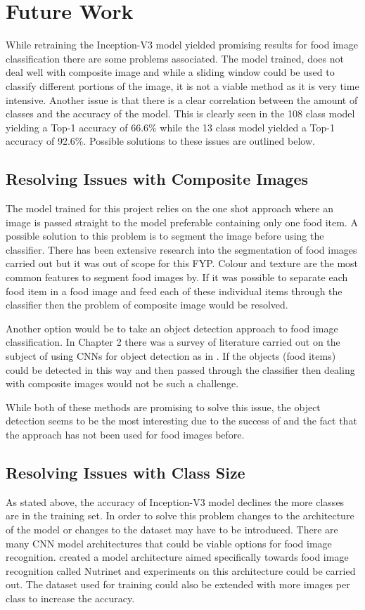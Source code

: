 

\section{Future Work}
While retraining the Inception-V3 model yielded promising results for food image classification there are some problems associated.
The model trained, does not deal well with composite image and while a sliding window could be used to classify different portions of the image, it is not a viable method as it is very time intensive.
Another issue is that there is a clear correlation between the amount of classes and the accuracy of the model.
This is clearly seen in the 108 class model yielding a Top-1 accuracy of 66.6\% while the 13 class model yielded a Top-1 accuracy of 92.6\%.
Possible solutions to these issues are outlined below.

\subsection*{Resolving Issues with Composite Images}
The model trained for this project relies on the one shot approach where an image is passed straight to the model preferable containing only one food item.
A possible solution to this problem is to segment the image before using the classifier.
There has been extensive research into the segmentation of food images carried out but it was out of scope for this FYP.
Colour and texture are the most common features to segment food images by.
If it was possible to separate each food item in a food image and feed each of these individual items through the classifier then the problem of composite image would be resolved.

Another option would be to take an object detection approach to food image classification.
In Chapter 2 there was a survey of literature carried out on the subject of
using CNNs for object detection as in \parencite{maskRcnn}.
If the objects (food items) could be detected in this way and then passed through the classifier then dealing with composite images would not be such a challenge.

While both of these methods are promising to solve this issue, the object detection seems to be the most interesting due to the success of \parencite{maskRcnn} and the fact that the approach has not been used for food images before.

\subsection*{Resolving Issues with Class Size}
As stated above, the accuracy of Inception-V3 model declines the more classes are in the training set.
In order to solve this problem changes to the architecture of the model or
changes to the dataset may have to be introduced.
There are many CNN model architectures that could be viable options for food image recognition.
\parencite{nutrinet} created a model architecture aimed specifically towards food image recognition called Nutrinet and experiments on this architecture could be carried out.
The dataset used for training could also be extended with more images per class to increase the accuracy.

